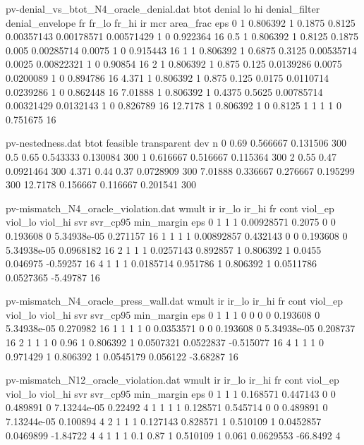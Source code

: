 \begin{filecontents*}[overwrite]{pv-denial_vs_btot_N4_oracle_denial.dat}
btot denial lo hi denial_filter denial_envelope fr fr_lo fr_hi ir mcr area_frac eps
0 1 0.806392 1 0.1875 0.8125 0.00357143 0.00178571 0.00571429 1 0 0.922364 16
0.5 1 0.806392 1 0.8125 0.1875 0.005 0.00285714 0.0075 1 0 0.915443 16
1 1 0.806392 1 0.6875 0.3125 0.00535714 0.0025 0.00822321 1 0 0.90854 16
2 1 0.806392 1 0.875 0.125 0.0139286 0.0075 0.0200089 1 0 0.894786 16
4.371 1 0.806392 1 0.875 0.125 0.0175 0.0110714 0.0239286 1 0 0.862448 16
7.01888 1 0.806392 1 0.4375 0.5625 0.00785714 0.00321429 0.0132143 1 0 0.826789 16
12.7178 1 0.806392 1 0 0.8125 1 1 1 1 0 0.751675 16
\end{filecontents*}
\begin{filecontents*}[overwrite]{pv-nestedness.dat}
btot feasible transparent dev n
0 0.69 0.566667 0.131506 300
0.5 0.65 0.543333 0.130084 300
1 0.616667 0.516667 0.115364 300
2 0.55 0.47 0.0921464 300
4.371 0.44 0.37 0.0728909 300
7.01888 0.336667 0.276667 0.195299 300
12.7178 0.156667 0.116667 0.201541 300
\end{filecontents*}
\begin{filecontents*}[overwrite]{pv-mismatch_N4_oracle_violation.dat}
wmult ir ir_lo ir_hi fr cont viol_ep viol_lo viol_hi svr svr_cp95 min_margin eps
0 1 1 1 0.00928571 0.2075 0 0 0.193608 0 5.34938e-05 0.271157 16
1 1 1 1 0.00892857 0.432143 0 0 0.193608 0 5.34938e-05 0.0968182 16
2 1 1 1 0.0257143 0.892857 1 0.806392 1 0.0455 0.046975 -0.59257 16
4 1 1 1 0.0185714 0.951786 1 0.806392 1 0.0511786 0.0527365 -5.49787 16
\end{filecontents*}
\begin{filecontents*}[overwrite]{pv-mismatch_N4_oracle_press_wall.dat}
wmult ir ir_lo ir_hi fr cont viol_ep viol_lo viol_hi svr svr_cp95 min_margin eps
0 1 1 1 0 0 0 0 0.193608 0 5.34938e-05 0.270982 16
1 1 1 1 0 0.0353571 0 0 0.193608 0 5.34938e-05 0.208737 16
2 1 1 1 0 0.96 1 0.806392 1 0.0507321 0.0522837 -0.515077 16
4 1 1 1 0 0.971429 1 0.806392 1 0.0545179 0.056122 -3.68287 16
\end{filecontents*}
\begin{filecontents*}[overwrite]{pv-mismatch_N12_oracle_violation.dat}
wmult ir ir_lo ir_hi fr cont viol_ep viol_lo viol_hi svr svr_cp95 min_margin eps
0 1 1 1 0.168571 0.447143 0 0 0.489891 0 7.13244e-05 0.22492 4
1 1 1 1 0.128571 0.545714 0 0 0.489891 0 7.13244e-05 0.100894 4
2 1 1 1 0.127143 0.828571 1 0.510109 1 0.0452857 0.0469899 -1.84722 4
4 1 1 1 0.1 0.87 1 0.510109 1 0.061 0.0629553 -66.8492 4
\end{filecontents*}
